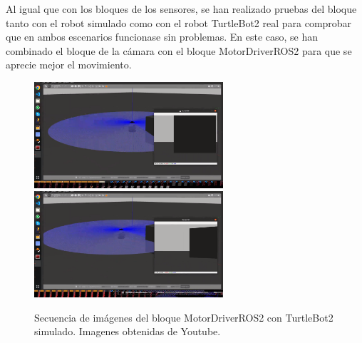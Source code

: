 Al igual que con los bloques de los sensores, se han realizado pruebas del bloque tanto con el robot simulado como con el robot TurtleBot2 real
para comprobar que en ambos escenarios funcionase sin problemas. En este caso, se han combinado el bloque de la cámara con el bloque MotorDriverROS2
para que se aprecie mejor el movimiento.

\begin{figure} [H]
  \begin{center}
      \includegraphics[width=7cm]{figs/c4/motorS1.png}
      \includegraphics[width=7cm]{figs/c4/motorS2.png}
  \end{center}
  \caption[Secuencia bloque cámara ROS2 simulado]{Secuencia de imágenes del bloque MotorDriverROS2 con TurtleBot2 simulado. Imagenes obtenidas de Youtube\footnotemark.}
  \label{fig:vid_motS}
\end{figure}

